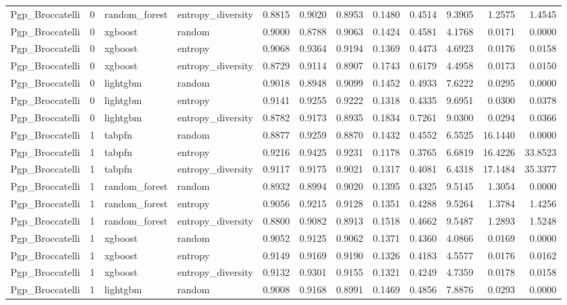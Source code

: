 \begin{tabular}{lrllrrrrrrrr}
Pgp_Broccatelli & 0 & random_forest & entropy_diversity & 0.8815 & 0.9020 & 0.8953 & 0.1480 & 0.4514 & 9.3905 & 1.2575 & 1.4545 \\
Pgp_Broccatelli & 0 & xgboost & random & 0.9000 & 0.8788 & 0.9063 & 0.1424 & 0.4581 & 4.1768 & 0.0171 & 0.0000 \\
Pgp_Broccatelli & 0 & xgboost & entropy & 0.9068 & 0.9364 & 0.9194 & 0.1369 & 0.4473 & 4.6923 & 0.0176 & 0.0158 \\
Pgp_Broccatelli & 0 & xgboost & entropy_diversity & 0.8729 & 0.9114 & 0.8907 & 0.1743 & 0.6179 & 4.4958 & 0.0173 & 0.0150 \\
Pgp_Broccatelli & 0 & lightgbm & random & 0.9018 & 0.8948 & 0.9099 & 0.1452 & 0.4933 & 7.6222 & 0.0295 & 0.0000 \\
Pgp_Broccatelli & 0 & lightgbm & entropy & 0.9141 & 0.9255 & 0.9222 & 0.1318 & 0.4335 & 9.6951 & 0.0300 & 0.0378 \\
Pgp_Broccatelli & 0 & lightgbm & entropy_diversity & 0.8782 & 0.9173 & 0.8935 & 0.1834 & 0.7261 & 9.0300 & 0.0294 & 0.0366 \\
Pgp_Broccatelli & 1 & tabpfn & random & 0.8877 & 0.9259 & 0.8870 & 0.1432 & 0.4552 & 6.5525 & 16.1440 & 0.0000 \\
Pgp_Broccatelli & 1 & tabpfn & entropy & 0.9216 & 0.9425 & 0.9231 & 0.1178 & 0.3765 & 6.6819 & 16.4226 & 33.8523 \\
Pgp_Broccatelli & 1 & tabpfn & entropy_diversity & 0.9117 & 0.9175 & 0.9021 & 0.1317 & 0.4081 & 6.4318 & 17.1484 & 35.3377 \\
Pgp_Broccatelli & 1 & random_forest & random & 0.8932 & 0.8994 & 0.9020 & 0.1395 & 0.4325 & 9.5145 & 1.3054 & 0.0000 \\
Pgp_Broccatelli & 1 & random_forest & entropy & 0.9056 & 0.9215 & 0.9128 & 0.1351 & 0.4288 & 9.5264 & 1.3784 & 1.4256 \\
Pgp_Broccatelli & 1 & random_forest & entropy_diversity & 0.8800 & 0.9082 & 0.8913 & 0.1518 & 0.4662 & 9.5487 & 1.2893 & 1.5248 \\
Pgp_Broccatelli & 1 & xgboost & random & 0.9052 & 0.9125 & 0.9062 & 0.1371 & 0.4360 & 4.0866 & 0.0169 & 0.0000 \\
Pgp_Broccatelli & 1 & xgboost & entropy & 0.9149 & 0.9169 & 0.9190 & 0.1326 & 0.4183 & 4.5577 & 0.0176 & 0.0162 \\
Pgp_Broccatelli & 1 & xgboost & entropy_diversity & 0.9132 & 0.9301 & 0.9155 & 0.1321 & 0.4249 & 4.7359 & 0.0178 & 0.0158 \\
Pgp_Broccatelli & 1 & lightgbm & random & 0.9008 & 0.9168 & 0.8991 & 0.1469 & 0.4856 & 7.8876 & 0.0293 & 0.0000 \\

\end{tabular}
